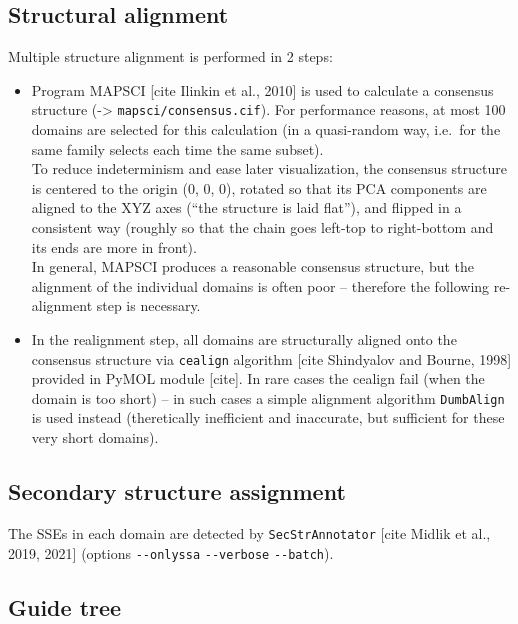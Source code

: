 \documentclass[12pt,draft]{article}
\let\oldtexttt\texttt
\renewcommand{\texttt}[1]{\textcolor{CodeColor}{\oldtexttt{#1}}}
\begin{document}
\hypertarget{structural-alignment}{%
\subsection{Structural alignment}\label{structural-alignment}}

Multiple structure alignment is performed in 2 steps:

\begin{itemize}
\item
  Program MAPSCI {[}cite Ilinkin et al., 2010{]} is used to calculate a
  consensus structure (-\textgreater{} \texttt{mapsci/consensus.cif}).
  For performance reasons, at most 100 domains are selected for this
  calculation (in a quasi-random way, i.e.~for the same family selects
  each time the same subset).\\
  To reduce indeterminism and ease later visualization, the consensus
  structure is centered to the origin (0, 0, 0), rotated so that its PCA
  components are aligned to the XYZ axes (``the structure is laid
  flat''), and flipped in a consistent way (roughly so that the chain
  goes left-top to right-bottom and its ends are more in front).\\
  In general, MAPSCI produces a reasonable consensus structure, but the
  alignment of the individual domains is often poor -- therefore the
  following re-alignment step is necessary.
\item
  In the realignment step, all domains are structurally aligned onto the
  consensus structure via \texttt{cealign} algorithm {[}cite Shindyalov
  and Bourne, 1998{]} provided in PyMOL module {[}cite{]}. In rare cases
  the cealign fail (when the domain is too short) -- in such cases a
  simple alignment algorithm \texttt{DumbAlign} is used instead
  (theretically inefficient and inaccurate, but sufficient for these
  very short domains).
\end{itemize}

\hypertarget{secondary-structure-assignment}{%
\subsection{Secondary structure
assignment}\label{secondary-structure-assignment}}

The SSEs in each domain are detected by \texttt{SecStrAnnotator} {[}cite
Midlik et al., 2019, 2021{]} (options \texttt{-\/-onlyssa}
\texttt{-\/-verbose} \texttt{-\/-batch}).

\hypertarget{guide-tree}{%
\subsection{Guide tree}\label{guide-tree}}
\end{document}
